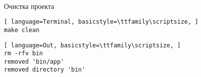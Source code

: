 \paragraph{}
Очистка проекта

\begin{lstlisting}[ language=Terminal, basicstyle=\ttfamily\scriptsize, ]
make clean
\end{lstlisting}
    
\begin{lstlisting}[ language=Out, basicstyle=\ttfamily\scriptsize, ]
rm -rfv bin
removed 'bin/app'
removed directory 'bin'
\end{lstlisting}

\newpage
